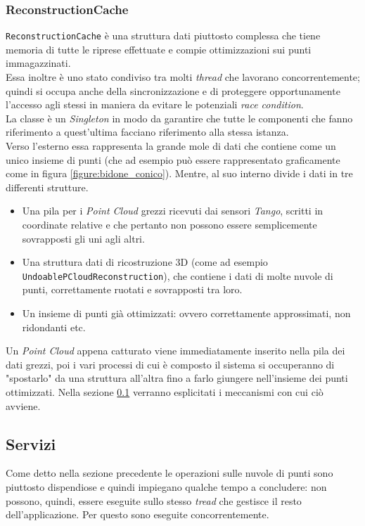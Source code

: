 \subsubsection{ReconstructionCache}
\texttt{ReconstructionCache} è una struttura dati piuttosto complessa che tiene memoria di tutte le riprese effettuate e compie ottimizzazioni sui punti immagazzinati.\\
Essa inoltre è uno stato condiviso tra molti \emph{thread} che lavorano concorrentemente; quindi si occupa anche della sincronizzazione e di proteggere opportunamente l'accesso agli stessi in maniera da evitare le potenziali \emph{race condition}.\\
La classe è un \emph{Singleton} in modo da garantire che tutte le componenti che fanno riferimento a quest'ultima facciano riferimento alla stessa istanza.\\
Verso l'esterno essa rappresenta la grande mole di dati che contiene come un unico insieme di punti (che ad esempio può essere rappresentato graficamente come in figura \ref{figure:bidone_conico}). Mentre, al suo interno divide i dati in tre differenti strutture.
\begin{itemize}
	\item Una pila per i \emph{Point Cloud} grezzi ricevuti dai sensori \emph{Tango}, scritti in coordinate relative e che pertanto non possono essere semplicemente sovrapposti gli uni agli altri.
	\item Una struttura dati di ricostruzione 3D (come ad esempio \\\texttt{UndoablePCloudReconstruction}), che contiene i dati di molte nuvole di punti, correttamente ruotati e sovrapposti tra loro.
	\item Un insieme di punti già ottimizzati: ovvero correttamente approssimati, non ridondanti etc. 
\end{itemize}
Un \emph{Point Cloud} appena catturato viene immediatamente inserito nella pila dei dati grezzi, poi i vari processi di cui è composto il sistema si occuperanno di "spostarlo" da una struttura all'altra fino a farlo giungere nell'insieme dei punti ottimizzati. Nella sezione \ref{section:Servizi} verranno esplicitati i meccanismi con cui ciò avviene.

\subsection{Servizi}\label{section:Servizi}
Come detto nella sezione precedente le operazioni sulle nuvole di punti sono piuttosto dispendiose e quindi impiegano qualche tempo a concludere: non possono, quindi, essere eseguite sullo stesso \emph{tread} che gestisce il resto dell'applicazione. Per questo sono eseguite concorrentemente.
